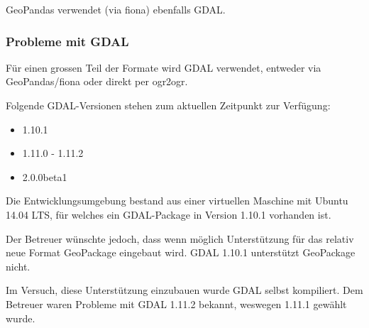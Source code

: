 
GeoPandas verwendet (via fiona) ebenfalls GDAL.

\subsubsection{Probleme mit GDAL}\label{sec:pd:format-gdal-problems}
Für einen grossen Teil der Formate wird GDAL verwendet, entweder via GeoPandas/fiona oder direkt per ogr2ogr. 

Folgende GDAL-Versionen stehen zum aktuellen Zeitpunkt zur Verfügung:
\begin{itemize}
\item 1.10.1
\item 1.11.0 - 1.11.2
\item 2.0.0beta1
\end{itemize}

Die Entwicklungsumgebung bestand aus einer virtuellen Maschine mit Ubuntu 14.04 LTS, für welches ein GDAL-Package in Version 1.10.1 vorhanden ist. 

Der Betreuer wünschte jedoch, dass wenn möglich Unterstützung für das relativ neue Format GeoPackage eingebaut wird. GDAL 1.10.1 unterstützt GeoPackage nicht.

Im Versuch, diese Unterstützung einzubauen wurde GDAL selbst kompiliert. Dem Betreuer waren Probleme mit GDAL 1.11.2 bekannt, weswegen 1.11.1 gewählt wurde.

